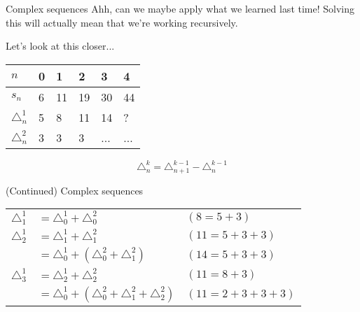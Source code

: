 {\begin{intro}{Complex sequences}
        Ahh, can we maybe apply what we learned last time! Solving this will
        actually mean that we're working recursively.

        Let's look at this closer...

        \begin{center}
            \begin{tabular}{l | l l l l l}
                $n$ & 0 & 1 & 2 & 3 & 4
                \\ \hline
                $s_{n}$ & 6 & 11 & 19 & 30 & 44
                \\ \hline
                $\triangle_{n}^{1}$ & 5 & 8 & 11 & 14 & ?
                \\ \hline
                $\triangle_{n}^{2}$ & 3 & 3 & 3 & ... & ...
            \end{tabular}
        \end{center}

        $$\triangle_{n}^{k} = \triangle_{n+1}^{k-1} - \triangle_{n}^{k-1}$$
        
    \end{intro}

    \newpage


    \begin{intro}{(Continued) Complex sequences}
        
        \begin{center}
            \begin{tabular}{c l | l}
                $\triangle_{1}^{1}$
                &           $= \triangle_{0}^{1} + \triangle_{0}^{2}$
                & $(8 = 5 + 3)$
                \\
                $\triangle_{2}^{1}$
                &           $= \triangle_{1}^{1} + \triangle_{1}^{2}$
                & $(11 = 5 + 3 + 3)$
                \\
                &           $= \triangle_{0}^{1} + (\triangle_{0}^{2} + \triangle_{1}^{2})$
                & $(14 = 5 + 3 + 3)$
                \\
                $\triangle_{3}^{1}$
                &           $= \triangle_{2}^{1} + \triangle_{2}^{2}$
                & $(11 = 8 + 3)$
                \\
                &           $= \triangle_{0}^{1} + (\triangle_{0}^{2} + \triangle_{1}^{2} + \triangle_{2}^{2})$ & $(11 = 2 + 3 + 3 + 3)$
            \end{tabular}
        \end{center}


\end{intro}}
